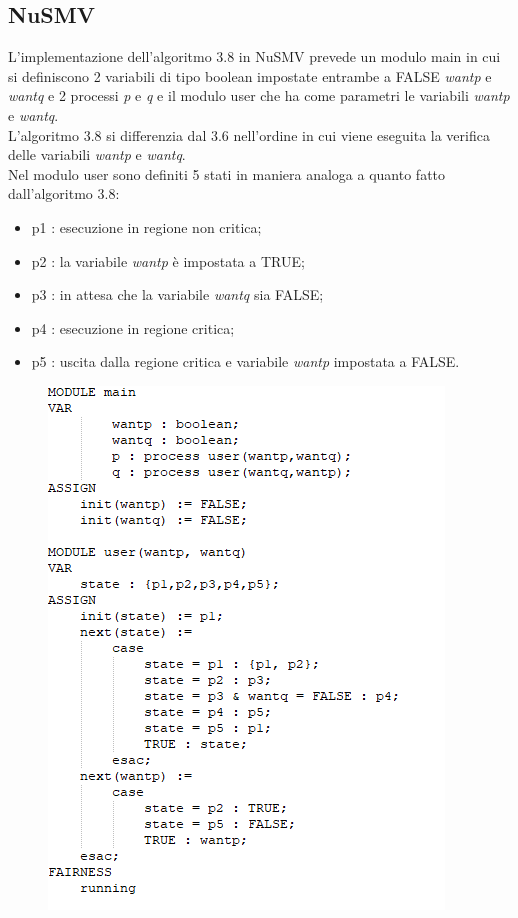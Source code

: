 \documentclass{article}
\begin{document}
\subsection{NuSMV}
L'implementazione dell'algoritmo 3.8 in NuSMV prevede un modulo main in cui si definiscono 2 variabili di tipo boolean impostate entrambe a FALSE \textit{wantp} e \textit{wantq} e 2 processi \textit{p} e \textit{q} e il modulo user che ha come parametri le variabili  \textit{wantp} e \textit{wantq}. 
\\L'algoritmo 3.8 si differenzia dal 3.6 nell'ordine in cui viene eseguita la verifica delle variabili \textit{wantp} e \textit{wantq}.
\\Nel modulo user sono definiti 5 stati in maniera analoga a quanto fatto dall'algoritmo 3.8:
\begin{itemize}
    \item p1 : esecuzione in regione non critica;
    \item p2 : la variabile \textit{wantp} è impostata a TRUE;
    \item p3 : in attesa che la variabile \textit{wantq} sia FALSE;
    \item p4 : esecuzione in regione critica;
    \item p5 : uscita dalla regione critica e variabile \textit{wantp} impostata a FALSE.
\end{itemize}
\begin{figure}[h] 
\centering
\includegraphics[scale=1.1]{3.8nusmv.png}
\end{figure}
\end{document}
